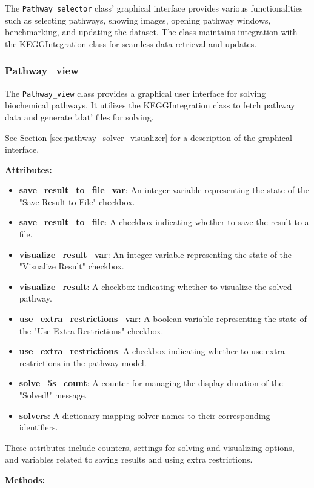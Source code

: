 The \texttt{Pathway\_selector} class' graphical interface provides various functionalities such as selecting pathways, showing images, opening pathway windows, benchmarking, and updating the dataset. The class maintains integration with the KEGGIntegration class for seamless data retrieval and updates.

\subsubsection{Pathway\_view}

The \texttt{Pathway\_view} class provides a graphical user interface for solving biochemical pathways. It utilizes the KEGGIntegration class to fetch pathway data and generate '.dat' files for solving.

See Section \ref{sec:pathway_solver_visualizer} for a description of the graphical interface.

\textbf{Attributes:}

\begin{itemize}
    \item \textbf{save\_result\_to\_file\_var}: An integer variable representing the state of the "Save Result to File" checkbox.
    \item \textbf{save\_result\_to\_file}: A checkbox indicating whether to save the result to a file.
    \item \textbf{visualize\_result\_var}: An integer variable representing the state of the "Visualize Result" checkbox.
    \item \textbf{visualize\_result}: A checkbox indicating whether to visualize the solved pathway.
    \item \textbf{use\_extra\_restrictions\_var}: A boolean variable representing the state of the "Use Extra Restrictions" checkbox.
    \item \textbf{use\_extra\_restrictions}: A checkbox indicating whether to use extra restrictions in the pathway model.
    \item \textbf{solve\_5s\_count}: A counter for managing the display duration of the "Solved!" message.
    \item \textbf{solvers}: A dictionary mapping solver names to their corresponding identifiers.
\end{itemize}

These attributes include counters, settings for solving and visualizing options, and variables related to saving results and using extra restrictions.

\textbf{Methods:}

